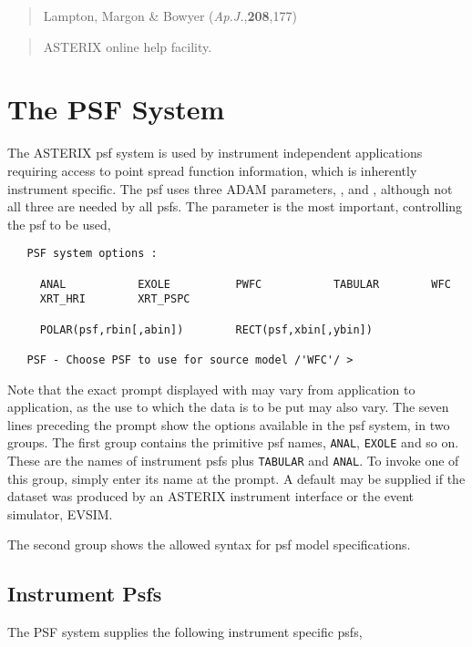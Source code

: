 \begin{verse}
\hspace{-9.2mm}
Lampton, Margon \& Bowyer ({\it Ap.J.},{\bf 208},177)
\vspace{-2mm}
\end{verse}

\begin{verse}
\hspace{-9.2mm}
ASTERIX online help facility.
\vspace{-2mm}
\end{verse}
\setlength{\parindent}{0mm}

\newpage
\appendix

\section{The PSF System}
\label{psf:system}

The ASTERIX psf system is used by instrument independent applications 
requiring access to point spread function information, which is
inherently instrument specific. The psf uses three ADAM parameters,
,  and , although not all three are
needed by all psfs.  The  parameter is the most important,
controlling the psf to be used,
\begin{verbatim}
   PSF system options :

     ANAL           EXOLE          PWFC           TABULAR        WFC
     XRT_HRI        XRT_PSPC

     POLAR(psf,rbin[,abin])        RECT(psf,xbin[,ybin])

   PSF - Choose PSF to use for source model /'WFC'/ > 
\end{verbatim}
Note that the exact prompt displayed with  may vary from
application to application, as the use to which the data is to be put
may also vary. The seven lines preceding the prompt show the options
available in the psf system, in two groups. The first group contains
the primitive psf names, \verb+ANAL+, \verb+EXOLE+ and so on. These
are the names of instrument psfs plus \verb+TABULAR+ and \verb+ANAL+.
To invoke one of this group, simply enter its name at the 
prompt. A default may be supplied if the dataset was produced by an
ASTERIX instrument interface or the event simulator, EVSIM.

The second group shows the allowed syntax for psf model specifications.

\subsection{Instrument Psfs}
\label{psf:inspsfs}
The PSF system supplies the following instrument specific psfs,

